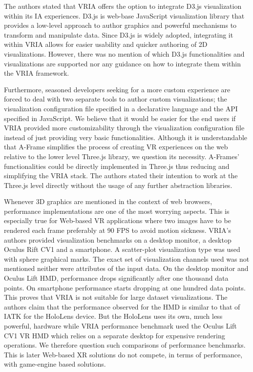 \documentclass{vgtc}                          %
\begin{document}
\medskip

\noindent The authors stated that VRIA offers the option to integrate D3.js \cite{d3_js} visualization within its IA
experiences. D3.js is web-base JavaScript visualization library that provides a low-level approach to author
graphics and powerful mechanisms to transform and manipulate data. Since D3.js is widely adopted, integrating
it within VRIA allows for easier usability and quicker authoring of 2D visualizations. However, there was no
mention of which D3.js functionalities and visualizations are supported nor any guidance on how to integrate
them within the VRIA framework.

\medskip

\noindent Furthermore, seasoned developers seeking for a more custom experience are forced to deal with two
separate tools to author custom visualizations; the visualization configuration file specified in a
declarative language and the API specified in JavaScript. We believe that it would be easier for the end
users if VRIA provided more customizability through the visualization configuration file instead of just
providing very basic functionalities. Although it is understandable that A-Frame simplifies the process of
creating VR experiences on the web relative to the lower level Three.js library, we question its necessity.
A-Frames' functionalities could be directly implemented in Three.js thus reducing and simplifying the VRIA
stack. The authors stated their intention to work at the Three.js level directly without the usage of any
further abstraction libraries.

\medskip

\noindent Whenever 3D graphics are mentioned in the context of web browsers,
performance implementations are one of the most worrying aspects. This is
especially true for Web-based VR applications where two images have to be
rendered each frame preferably at 90 FPS to avoid motion sickness. VRIA's
authors provided visualization benchmarks on a desktop monitor, a desktop
Oculus Rift CV1 and a smartphone. A scatter-plot visualization type was used
with sphere graphical marks. The exact set of visualization channels used
was not mentioned neither were attributes of the input data. On the desktop
monitor and Oculus Lift HMD, performance drops significantly after one
thousand data points. On smartphone performance starts dropping at one hundred
data points. This proves that VRIA is not suitable for large dataset
visualizations. The authors claim that the performance observed for the HMD
is similar to that of IATK for the HoloLens device. But the HoloLens uses
its own, much less powerful, hardware while VRIA performance benchmark used
the Oculus Lift CV1 VR HMD which relies on a separate desktop for expensive
rendering operations. We therefore question such comparisons of performance
benchmarks. This is later Web-based XR solutions do not compete,
in terms of performance, with game-engine based solutions.
\end{document}
